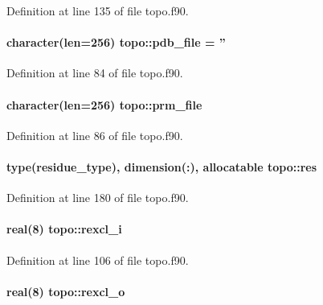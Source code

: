 Definition at line 135 of file topo.\-f90.

\hypertarget{classtopo_a90f0e1e8f5270c20cb96cdaa565c7d5b}{
\paragraph[{pdb\-\_\-file}]{\setlength{\rightskip}{0pt plus 5cm}character(len=256) topo\-::pdb\-\_\-file = ''}}\label{classtopo_a90f0e1e8f5270c20cb96cdaa565c7d5b}


Definition at line 84 of file topo.\-f90.

\hypertarget{classtopo_a49ba5e9d5475fd58013ee8e5931480b0}{
\paragraph[{prm\-\_\-file}]{\setlength{\rightskip}{0pt plus 5cm}character(len=256) topo\-::prm\-\_\-file}}\label{classtopo_a49ba5e9d5475fd58013ee8e5931480b0}


Definition at line 86 of file topo.\-f90.

\hypertarget{classtopo_a0867b2ae350f5df1e287c48074a88be7}{
\paragraph[{res}]{\setlength{\rightskip}{0pt plus 5cm}type({\bf residue\-\_\-type}), dimension(\-:), allocatable topo\-::res}}\label{classtopo_a0867b2ae350f5df1e287c48074a88be7}


Definition at line 180 of file topo.\-f90.

\hypertarget{classtopo_a620b9479ac6c966db149f0c9e0724c33}{
\paragraph[{rexcl\-\_\-i}]{\setlength{\rightskip}{0pt plus 5cm}real(8) topo\-::rexcl\-\_\-i}}\label{classtopo_a620b9479ac6c966db149f0c9e0724c33}


Definition at line 106 of file topo.\-f90.

\hypertarget{classtopo_a4366d13c72ff459b53a9d5d4bfa3fbf1}{
\paragraph[{rexcl\-\_\-o}]{\setlength{\rightskip}{0pt plus 5cm}real(8) topo\-::rexcl\-\_\-o}}\label{classtopo_a4366d13c72ff459b53a9d5d4bfa3fbf1}


